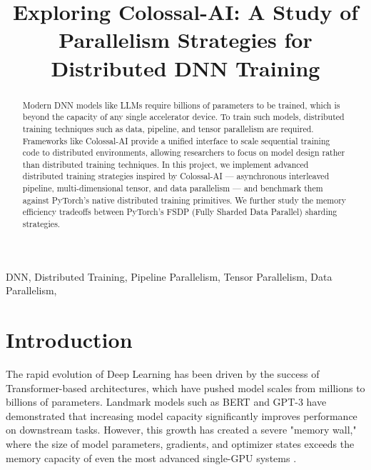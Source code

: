 \documentclass[conference]{IEEEtran}
\begin{document}
\title{Exploring Colossal-AI: A Study of Parallelism Strategies for Distributed DNN Training\\}

\author{
\and
{}
\and
{}
\and
{}
}

\maketitle

\begin{abstract}
Modern DNN models like LLMs require billions of parameters to be trained, which is beyond the capacity of any single accelerator device. To train such models, distributed training techniques such as data, pipeline, and tensor parallelism are required. Frameworks like Colossal-AI provide a unified interface to scale sequential training code to distributed environments, allowing researchers to focus on model design rather than distributed training techniques. In this project, we implement advanced distributed training strategies inspired by Colossal-AI — asynchronous interleaved pipeline, multi-dimensional tensor, and data parallelism — and benchmark them against PyTorch's native distributed training primitives. We further study the memory efficiency tradeoffs between PyTorch's FSDP (Fully Sharded Data Parallel) sharding strategies.
\end{abstract}

\begin{IEEEkeywords}
DNN, Distributed Training, Pipeline Parallelism, Tensor Parallelism, Data Parallelism,
\end{IEEEkeywords}

\section{Introduction}
The rapid evolution of Deep Learning has been driven by the success of Transformer-based architectures, which have pushed model scales from millions to billions of parameters. Landmark models such as BERT \cite{DBLP:journals/corr/abs-1810-04805} and GPT-3 \cite{DBLP:journals/corr/abs-2005-14165} have demonstrated that increasing model capacity significantly improves performance on downstream tasks. However, this growth has created a severe "memory wall," where the size of model parameters, gradients, and optimizer states exceeds the memory capacity of even the most advanced single-GPU systems \cite{10.1145/3605573.3605613}.
\end{document}

